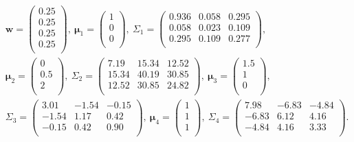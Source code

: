 \documentclass[a4j,12pt]{jarticle}
\begin{document}
\begin{equation}
\label{sim_parameter_real}
\begin{split}
&\bm w = \begin{pmatrix} 0.25 \\ 0.25 \\ 0.25 \\ 0.25 \\ \end{pmatrix},\ 
\bm \mu_1 = \begin{pmatrix} 1 \\ 0 \\ 0 \\ \end{pmatrix},\ 
\Sigma_1 = \begin{pmatrix}  0.936 & 0.058 &  0.295 \\ 0.058 & 0.023 & 0.109 \\ 0.295 & 0.109 & 0.277 \\ \end{pmatrix},\\ 
&\bm \mu_2 = \begin{pmatrix} 0 \\ 0.5 \\ 2 \\ \end{pmatrix},\ 
\Sigma_2 = \begin{pmatrix}   7.19  & 15.34 & 12.52 \\ 15.34 & 40.19 & 30.85 \\  12.52 & 30.85 & 24.82 \\ \end{pmatrix},\  
\bm \mu_3 = \begin{pmatrix} 1.5 \\ 1 \\ 0 \\ \end{pmatrix},\\ 
&\Sigma_3 = \begin{pmatrix}  3.01 & -1.54 &  -0.15 \\ -1.54 & 1.17 & 0.42 \\  -0.15 & 0.42 & 0.90 \\ \end{pmatrix},\ 
\bm \mu_4 = \begin{pmatrix} 1 \\ 1 \\ 1 \\ \end{pmatrix},\ 
\Sigma_4 = \begin{pmatrix} 7.98 & -6.83 & -4.84 \\ -6.83 & 6.12 & 4.16 \\ -4.84 & 4.16 & 3.33 \\ \end{pmatrix}. \\
\end{split}
\end{equation}
\end{document}
